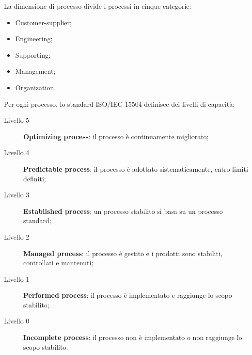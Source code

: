 \documentclass[PianoDiQualifica.tex]{subfiles}
\begin{document}
\begin{appendices}
La dimensione di processo divide i processi in cinque categorie:
\begin{itemize}
	\item Customer-supplier;
	\item Engineering;
	\item Supporting;
	\item Management;
	\item Organization.
\end{itemize}

Per ogni processo, lo standard ISO/IEC 15504 definisce dei livelli di capacità:
\begin{description}
	\item [\normalfont Livello 5] \textbf{Optimizing process}: il processo è continuamente migliorato;
	\item [\normalfont Livello 4] \textbf{Predictable process}: il processo è adottato sistematicamente, entro limiti definiti;
	\item [\normalfont Livello 3] \textbf{Established process}: un processo stabilito si basa su un processo standard;
	\item [\normalfont Livello 2] \textbf{Managed process}: il processo è gestito e i prodotti sono stabiliti, controllati e mantenuti;
	\item [\normalfont Livello 1] \textbf{Performed process}: il processo è implementato e raggiunge lo scopo stabilito;
	\item [\normalfont Livello 0] \textbf{Incomplete process}: il processo non è implementato o non raggiunge lo scopo stabilito.\\
\end{description}


\end{appendices}
\end{document}
